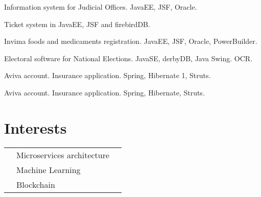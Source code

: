 \documentclass[]{deedy-resume-openfont}
\begin{document}
\begin{minipage}[t]{0.66\textwidth}
\begin{tightemize}
\item Information system for Judicial Offices. JavaEE, JSF, Oracle.   
\end{tightemize}
\sectionsep

\begin{tightemize}
\item Ticket system  in JavaEE, JSF and firebirdDB.  
\end{tightemize}
\sectionsep

\begin{tightemize}
\item Invima foods and medicaments registration. JavaEE, JSF, Oracle, PowerBuilder. 
\item Electoral software for National Elections. JavaSE, derbyDB, Java Swing. OCR. 
\end{tightemize}
\sectionsep

\begin{tightemize}
\item Aviva account. Insurance application. Spring, Hibernate 1, Struts. 
\end{tightemize}
\sectionsep

\begin{tightemize}
\item Aviva account. Insurance application. Spring, Hibernate, Struts. 
\end{tightemize}
\sectionsep


\section{Interests} 
\begin{tabular}{rll}
& Microservices architecture\\
& Machine Learning \\
& Blockchain \\
\end{tabular}
\sectionsep

\end{minipage} 
\end{document}
